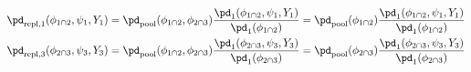 \begin{gather}
  \pd_{\text{repl}, 1}(\phi_{1 \cap 2}, \psi_{1}, Y_{1}) = 
    \pd_{\text{pool}}(\phi_{1 \cap 2}, \phi_{2 \cap 3})
    \frac{
      \pd_{1}(\phi_{1 \cap 2}, \psi_{1}, Y_{1})
    } {
      \pd_{1}(\phi_{1 \cap 2})
    }
  = 
    \pd_{\text{pool}}(\phi_{1 \cap 2})
    \frac{
      \pd_{1}(\phi_{1 \cap 2}, \psi_{1}, Y_{1})
    } {
      \pd_{1}(\phi_{1 \cap 2})
    } \label{eqn:chained-marginal-replacement-one} \\
  \pd_{\text{repl}, 3}(\phi_{2 \cap 3}, \psi_{3}, Y_{3}) = 
    \pd_{\text{pool}}(\phi_{1 \cap 2}, \phi_{2 \cap 3})
    \frac{
      \pd_{1}(\phi_{2 \cap 3}, \psi_{3}, Y_{3})
    } {
      \pd_{1}(\phi_{2 \cap 3})
    }
  =
    \pd_{\text{pool}}(\phi_{2 \cap 3})
    \frac{
      \pd_{1}(\phi_{2 \cap 3}, \psi_{3}, Y_{3})
    } {
      \pd_{1}(\phi_{2 \cap 3})
    }
  \label{eqn:chained-marginal-replacement-two}
\end{gather}